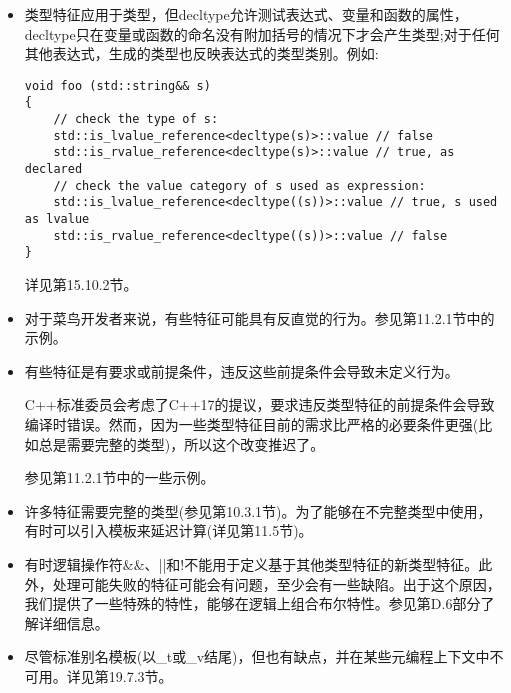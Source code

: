 \begin{itemize}
\item 
类型特征应用于类型，但decltype允许测试表达式、变量和函数的属性，decltype只在变量或函数的命名没有附加括号的情况下才会产生类型;对于任何其他表达式，生成的类型也反映表达式的类型类别。例如:

\begin{lstlisting}[style=styleCXX]
void foo (std::string&& s)
{
	// check the type of s:
	std::is_lvalue_reference<decltype(s)>::value // false
	std::is_rvalue_reference<decltype(s)>::value // true, as declared
	// check the value category of s used as expression:
	std::is_lvalue_reference<decltype((s))>::value // true, s used as lvalue
	std::is_rvalue_reference<decltype((s))>::value // false
}
\end{lstlisting}

详见第15.10.2节。

\item 
对于菜鸟开发者来说，有些特征可能具有反直觉的行为。参见第11.2.1节中的示例。

\item 
有些特征是有要求或前提条件，违反这些前提条件会导致未定义行为。

\begin{tcolorbox}[colback=webgreen!5!white,colframe=webgreen!75!black]
\hspace*{0.75cm}C++标准委员会考虑了C++17的提议，要求违反类型特征的前提条件会导致编译时错误。然而，因为一些类型特征目前的需求比严格的必要条件更强(比如总是需要完整的类型)，所以这个改变推迟了。
\end{tcolorbox}

参见第11.2.1节中的一些示例。

\item 
许多特征需要完整的类型(参见第10.3.1节)。为了能够在不完整类型中使用，有时可以引入模板来延迟计算(详见第11.5节)。

\item 
有时逻辑操作符\&\&、||和!不能用于定义基于其他类型特征的新类型特征。此外，处理可能失败的特征可能会有问题，至少会有一些缺陷。出于这个原因，我们提供了一些特殊的特性，能够在逻辑上组合布尔特性。参见第D.6部分了解详细信息。

\item 
尽管标准别名模板(以\_t或\_v结尾)，但也有缺点，并在某些元编程上下文中不可用。详见第19.7.3节。
\end{itemize}



